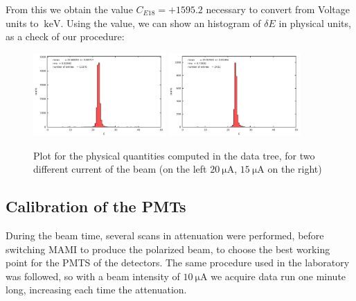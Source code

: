 From this we obtain the value $C_{E18} = +1595.2$ necessary to convert from Voltage units to $\SI{}{\kilo \electronvolt}$. Using the value, we can show an histogram of $\delta E$ in physical units, as a check of our procedure:

\begin{figure}[hbtp]
\centering
\includegraphics[width = 0.45\textwidth]{Analysis/ENMOCheck20.pdf}
\includegraphics[width = 0.45\textwidth]{Analysis/ENMOCheck15.pdf} 
\caption{Plot for the physical quantities computed in the data tree, for two different current of the beam (on the left $\SI{20}{\micro \ampere}$, $\SI{15}{\micro \ampere}$ on the right)}
\end{figure}
\newpage
\subsection{Calibration of the PMTs}


During the beam time, several scans in attenuation were performed, before switching MAMI to produce the polarized beam, to choose the best working point for the PMTS of the detectors. The same procedure used in the laboratory was followed, so with a beam intensity of $\SI{10}{\micro \ampere}$ we acquire data run one minute long, increasing each time the attenuation.

